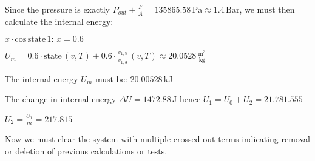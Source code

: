 Since the pressure is exactly \( P_{out} + \frac{F}{A} = 135865.58 \, \text{Pa} \approx 1.4 \, \text{Bar} \), we must then calculate the internal energy:

\( x \cdot \text{cos} \, \text{state} \, 1: \, x = 0.6 \)

\( U_m = 0.6 \cdot \text{state} \, (v, T) + 0.6 \cdot \frac{v_{1,5}}{v_{1,3}} \, (v, T) \approx 20.0528 \, \frac{\text{m}^3}{\text{kg}} \)

The internal energy \( U_{m} \) must be: \( 20.00528 \, \text{kJ} \)

The change in internal energy \( \Delta U = 1472.88 \, \text{J} \) hence \( U_1 = U_0 + U_2 = 21.781.555 \)

\( U_2 = \frac{U_1}{m} = 217.815 \)

Now we must clear the system with multiple crossed-out terms indicating removal or deletion of previous calculations or tests.